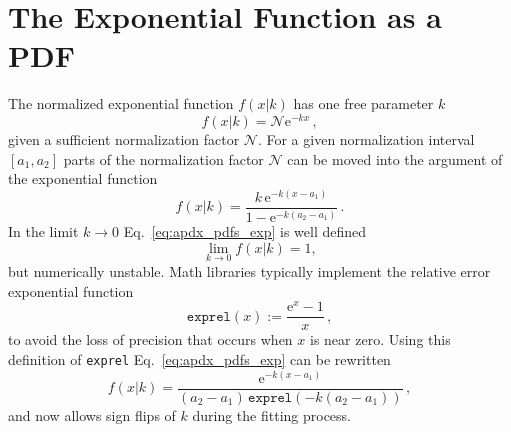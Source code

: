 \chapter{The Exponential Function as a PDF}
The normalized exponential function $f(x|k)$ has one free parameter $k$
\begin{equation*}
    f(x|k) = \mathcal{N} \mathrm{e}^{-kx} \,,
\end{equation*}
given a sufficient normalization factor $\mathcal{N}$.
For a given normalization interval $[a_1,a_2]$ parts of the normalization factor $\mathcal{N}$ can be moved into the argument of the exponential function
\begin{equation}
    \label{eq:apdx_pdfs_exp}
    f(x|k) = \frac{k \, \mathrm{e}^{-k(x-a_1)}}{1 - \mathrm{e}^{-k(a_2-a_1)}} \,.
\end{equation}
In the limit $k \to 0$ Eq.~\eqref{eq:apdx_pdfs_exp} is well defined
\begin{equation*}
    \lim_{k \to 0} f(x|k) = 1,
\end{equation*}
but numerically unstable.
Math libraries typically implement the relative error exponential function 
\begin{equation*}
    \texttt{exprel}(x) := \frac{\mathrm{e}^x - 1}{x} \,,
\end{equation*}
to avoid the loss of precision that occurs when $x$ is near zero.
Using this definition of \texttt{exprel} Eq.~\eqref{eq:apdx_pdfs_exp} can be rewritten
\begin{equation}
    \label{eq:apdx_pdfs_exprel}
    f(x|k) = \frac{\mathrm{e}^{-k(x-a_1)}}{(a_2-a_1) \, \texttt{exprel}(-k(a_2-a_1))} \,,
\end{equation}
and now allows sign flips of $k$ during the fitting process.

